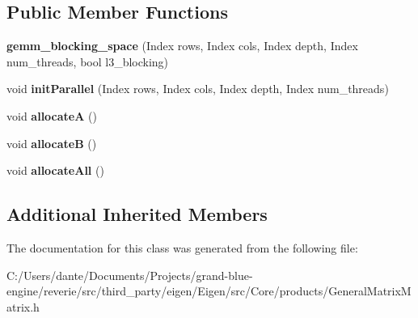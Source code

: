 \subsection*{Public Member Functions}
\begin{DoxyCompactItemize}
\item 
\mbox{\label{class_eigen_1_1internal_1_1gemm__blocking__space_3_01_storage_order_00_01___lhs_scalar_00_01___rbcde58016e0f2e47700c92659db0c8a7_a00ca99e0125fba9327b27ebaf8857210}} 
{\bfseries gemm\+\_\+blocking\+\_\+space} (Index rows, Index cols, Index depth, Index num\+\_\+threads, bool l3\+\_\+blocking)
\item 
\mbox{\label{class_eigen_1_1internal_1_1gemm__blocking__space_3_01_storage_order_00_01___lhs_scalar_00_01___rbcde58016e0f2e47700c92659db0c8a7_ae3b1f416735c6ffbc6e18230157ad6b1}} 
void {\bfseries init\+Parallel} (Index rows, Index cols, Index depth, Index num\+\_\+threads)
\item 
\mbox{\label{class_eigen_1_1internal_1_1gemm__blocking__space_3_01_storage_order_00_01___lhs_scalar_00_01___rbcde58016e0f2e47700c92659db0c8a7_a796058b275bd1d3549007261a77d1910}} 
void {\bfseries allocateA} ()
\item 
\mbox{\label{class_eigen_1_1internal_1_1gemm__blocking__space_3_01_storage_order_00_01___lhs_scalar_00_01___rbcde58016e0f2e47700c92659db0c8a7_a08d2c2897eda4217c05cc8e08f059c7d}} 
void {\bfseries allocateB} ()
\item 
\mbox{\label{class_eigen_1_1internal_1_1gemm__blocking__space_3_01_storage_order_00_01___lhs_scalar_00_01___rbcde58016e0f2e47700c92659db0c8a7_a3fdb31f71ae29f3975f55ff2af133779}} 
void {\bfseries allocate\+All} ()
\end{DoxyCompactItemize}
\subsection*{Additional Inherited Members}


The documentation for this class was generated from the following file\+:\begin{DoxyCompactItemize}
\item 
C\+:/\+Users/dante/\+Documents/\+Projects/grand-\/blue-\/engine/reverie/src/third\+\_\+party/eigen/\+Eigen/src/\+Core/products/General\+Matrix\+Matrix.\+h\end{DoxyCompactItemize}
